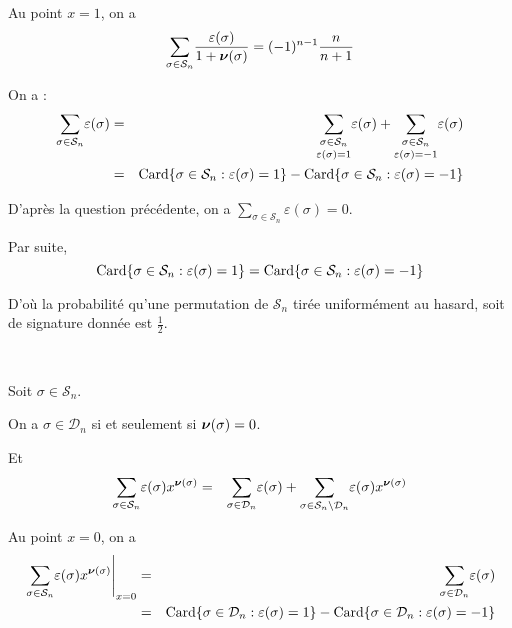 Au point $x = 1$, on a
\[ \underset{\sigma \in \mathcal{S}_n}{\sum} \frac{\varepsilon (\sigma)}{1
   +\boldsymbol{\nu} (\sigma)} = (- 1)^{n - 1} \frac{n}{n + 1} \]


 On a :
\begin{eqnarray*}
  \underset{\sigma \in \mathcal{S}_n}{\sum} \varepsilon (\sigma) & = &
  \underset{\varepsilon (\sigma) = 1}{\underset{\sigma \in
  \mathcal{S}_n}{\sum}} \varepsilon (\sigma) + \underset{\varepsilon (\sigma)
  = - 1}{\underset{\sigma \in \mathcal{S}_n}{\sum}} \varepsilon (\sigma)\\
  & = & \operatorname{Card} \{ \sigma \in \mathcal{S}_n : \varepsilon (\sigma) = 1 \}
  - \operatorname{Card} \{ \sigma \in \mathcal{S}_n : \varepsilon (\sigma) = - 1 \}
\end{eqnarray*}


D'apr{\`e}s la question pr{\'e}c{\'e}dente, on a $\underset{\sigma \in
\mathcal{S}_n}{\sum} \varepsilon (\sigma) = 0$.

Par suite,
\[ \operatorname{Card} \{ \sigma \in \mathcal{S}_n : \varepsilon (\sigma) = 1 \} =
   \operatorname{Card} \{ \sigma \in \mathcal{S}_n : \varepsilon (\sigma) = - 1 \} \]


D'o{\`u} la probabilit{\'e} qu'une permutation de $\mathcal{S}_n$ tir{\'e}e
uniform{\'e}ment au hasard, soit de signature donn{\'e}e est $\frac{1}{2} .$

\

 Soit $\sigma \in \mathcal{S}_n$.

On a $\sigma \in \mathcal{D}_n$ si et seulement si $\boldsymbol{\nu} (\sigma) =
0$.

Et
\begin{eqnarray*}
  \underset{\sigma \in \mathcal{S}_n}{\sum} \varepsilon (\sigma)
  x^{\boldsymbol{\nu} (\sigma)} & = & \underset{\sigma \in \mathcal{D}_n}{\sum}
  \varepsilon (\sigma) + \underset{\sigma \in \mathcal{S}_n \backslash
  \mathcal{D}_n}{\sum} \varepsilon (\sigma) x^{\boldsymbol{\nu} (\sigma)}
\end{eqnarray*}


Au point $x = 0$, on a
\begin{eqnarray*}
  \left. \underset{\sigma \in \mathcal{S}_n}{\sum} \varepsilon (\sigma)
  x^{\boldsymbol{\nu} (\sigma)} \right|_{x = 0} & = & \underset{\sigma \in
  \mathcal{D}_n}{\sum} \varepsilon (\sigma)\\
  & = & \operatorname{Card} \{ \sigma \in \mathcal{D}_n : \varepsilon (\sigma) = 1 \}
  - \operatorname{Card} \{ \sigma \in \mathcal{D}_n : \varepsilon (\sigma) = - 1 \}
\end{eqnarray*}



